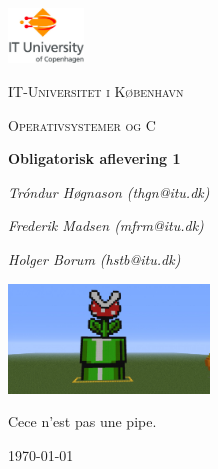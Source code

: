 
\begin{titlepage}
	\centering
	\includegraphics[width=0.15\textwidth]{logo}\par\vspace{1cm}
	{\scshape\LARGE IT-Universitet i København \par}
	\vspace{1cm}
	{\scshape\Large Operativsystemer og C\par}
	\vspace{1.5cm}
	{\huge\bfseries Obligatorisk aflevering 1\par}
	\vspace{2cm}
	{\Large\itshape Tróndur Høgnason (thgn@itu.dk)\par}
	{\Large\itshape Frederik Madsen (mfrm@itu.dk)\par}
	{\Large\itshape Holger Borum (hstb@itu.dk)\par}
	\vspace{1 cm}
	\includegraphics[width=0.4\textwidth]{pipe}\par\vspace{1cm}
	Cece n'est pas une pipe.\\
\vspace{1cm}
	{\large \today\par}
\end{titlepage}